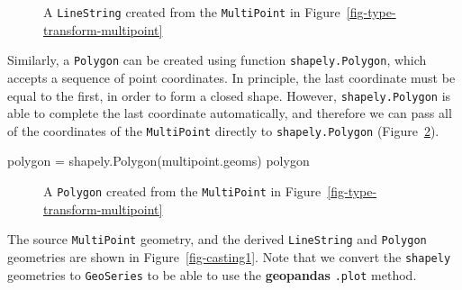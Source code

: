\documentclass[
  letterpaper,
]{krantz}
\newenvironment{Shaded}{\begin{snugshade}}{\end{snugshade}}
\newcommand{\NormalTok}[1]{\textcolor[rgb]{0.00,0.23,0.31}{#1}}
\newcommand{\OperatorTok}[1]{\textcolor[rgb]{0.37,0.37,0.37}{#1}}
\begin{document}
\begin{figure}[H]


\caption{\label{fig-type-transform-linestring}A
\texttt{\textquotesingle{}LineString\textquotesingle{}} created from the
\texttt{\textquotesingle{}MultiPoint\textquotesingle{}} in
Figure~\ref{fig-type-transform-multipoint}}

\end{figure}%

Similarly, a \texttt{\textquotesingle{}Polygon\textquotesingle{}} can be
created using function \texttt{shapely.Polygon}, which accepts a
sequence of point coordinates. In principle, the last coordinate must be
equal to the first, in order to form a closed shape. However,
\texttt{shapely.Polygon} is able to complete the last coordinate
automatically, and therefore we can pass all of the coordinates of the
\texttt{\textquotesingle{}MultiPoint\textquotesingle{}} directly to
\texttt{shapely.Polygon} (Figure~\ref{fig-type-transform-polygon}).

\begin{Shaded}
\begin{Highlighting}[]
\NormalTok{polygon }\OperatorTok{=}\NormalTok{ shapely.Polygon(multipoint.geoms)}
\NormalTok{polygon}
\end{Highlighting}
\end{Shaded}

\begin{figure}[H]


\caption{\label{fig-type-transform-polygon}A
\texttt{\textquotesingle{}Polygon\textquotesingle{}} created from the
\texttt{\textquotesingle{}MultiPoint\textquotesingle{}} in
Figure~\ref{fig-type-transform-multipoint}}

\end{figure}%

The source \texttt{\textquotesingle{}MultiPoint\textquotesingle{}}
geometry, and the derived
\texttt{\textquotesingle{}LineString\textquotesingle{}} and
\texttt{\textquotesingle{}Polygon\textquotesingle{}} geometries are
shown in Figure~\ref{fig-casting1}. Note that we convert the
\texttt{shapely} geometries to \texttt{GeoSeries} to be able to use the
\textbf{geopandas} \texttt{.plot} method.
\end{document}
